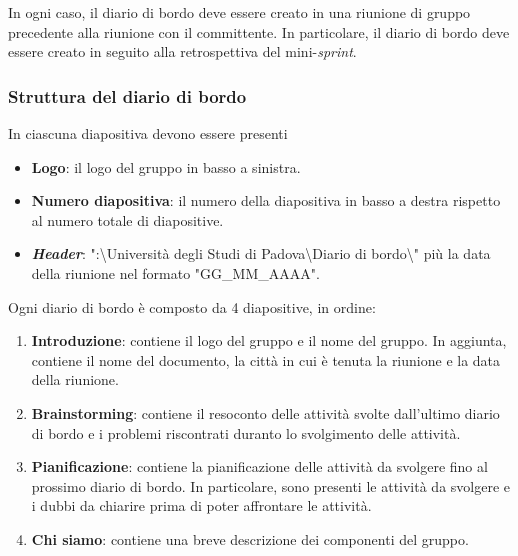In ogni caso, il diario di bordo deve essere creato in una riunione di gruppo
precedente alla riunione con il committente. In particolare, il diario di bordo
deve essere creato in seguito alla retrospettiva del mini-\textit{sprint}.

\subsubsection{Struttura del diario di bordo}

In ciascuna diapositiva devono essere presenti
\begin{itemize}
	\item \textbf{Logo}: il logo del gruppo in basso a sinistra.
	\item \textbf{Numero diapositiva}: il numero della diapositiva in basso a
	      destra rispetto al numero totale di diapositive.
	\item \textbf{\textit{Header}}: ":\textbackslash{}Università
	      degli Studi di Padova\textbackslash{}Diario di bordo\textbackslash{}"
	      più la data della riunione nel formato "GG\_MM\_AAAA".
\end{itemize}

Ogni diario di bordo è composto da 4 diapositive, in ordine:
\begin{enumerate}
	\item \textbf{Introduzione}: contiene il logo del gruppo e il nome del
	      gruppo. In aggiunta, contiene il nome del documento, la città in cui è
	      tenuta la riunione e la data della riunione.

	\item \textbf{Brainstorming}: contiene il resoconto delle attività svolte
	      dall'ultimo diario di bordo e i problemi riscontrati duranto lo
	      svolgimento delle attività.

	\item \textbf{Pianificazione}: contiene la pianificazione delle attività
	      da svolgere fino al prossimo diario di bordo. In particolare, sono
	      presenti le attività da svolgere e i dubbi da chiarire prima di poter
	      affrontare le attività.

	\item \textbf{Chi siamo}: contiene una breve descrizione dei componenti
	      del gruppo.
\end{enumerate}

